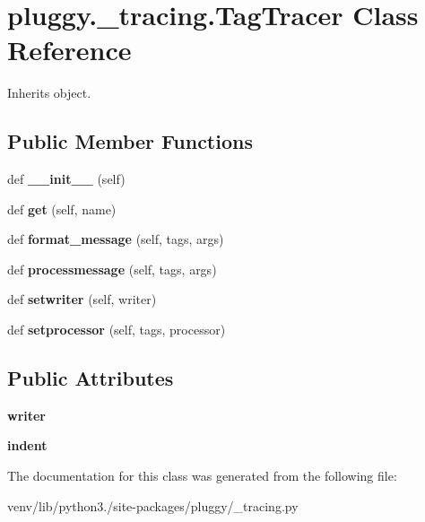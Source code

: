\hypertarget{classpluggy_1_1__tracing_1_1_tag_tracer}{}\section{pluggy.\+\_\+tracing.\+Tag\+Tracer Class Reference}
\label{classpluggy_1_1__tracing_1_1_tag_tracer}


Inherits object.

\subsection*{Public Member Functions}
\begin{DoxyCompactItemize}
\item 
\mbox{\label{classpluggy_1_1__tracing_1_1_tag_tracer_aa8b467eb0915c36aca72b80d3538ea8b}} 
def {\bfseries \+\_\+\+\_\+init\+\_\+\+\_\+} (self)
\item 
\mbox{\label{classpluggy_1_1__tracing_1_1_tag_tracer_a1225776b5b8ebdf19977b2a7a6c67dc2}} 
def {\bfseries get} (self, name)
\item 
\mbox{\label{classpluggy_1_1__tracing_1_1_tag_tracer_a46baccc0a16e8c49141d83708748605f}} 
def {\bfseries format\+\_\+message} (self, tags, args)
\item 
\mbox{\label{classpluggy_1_1__tracing_1_1_tag_tracer_a1b6808fa266286a2f81e8ff36a7ef641}} 
def {\bfseries processmessage} (self, tags, args)
\item 
\mbox{\label{classpluggy_1_1__tracing_1_1_tag_tracer_a40897e59e57954c829000776aea12821}} 
def {\bfseries setwriter} (self, writer)
\item 
\mbox{\label{classpluggy_1_1__tracing_1_1_tag_tracer_a44bed03b715c44f1fc844264ab797b8c}} 
def {\bfseries setprocessor} (self, tags, processor)
\end{DoxyCompactItemize}
\subsection*{Public Attributes}
\begin{DoxyCompactItemize}
\item 
\mbox{\label{classpluggy_1_1__tracing_1_1_tag_tracer_a1e1dcfd6e13cbdcf797e500d625611df}} 
{\bfseries writer}
\item 
\mbox{\label{classpluggy_1_1__tracing_1_1_tag_tracer_a962ef2c2c9c58998cb8dd7a64c494a53}} 
{\bfseries indent}
\end{DoxyCompactItemize}


The documentation for this class was generated from the following file\+:\begin{DoxyCompactItemize}
\item 
venv/lib/python3./site-\/packages/pluggy/\+\_\+tracing.\+py\end{DoxyCompactItemize}
